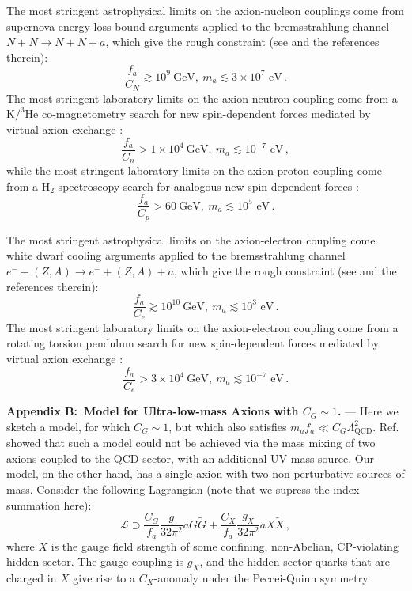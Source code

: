 The most stringent astrophysical limits on the axion-nucleon couplings come from supernova energy-loss bound arguments applied to the bremsstrahlung channel $N + N \to N + N + a$, which give the rough constraint (see \cite{Raffelt2008LNP} and the references therein):
\begin{equation}
\label{aNN_SN_limits}
\frac{f_a}{C_N} \gtrsim 10^9 ~\textrm{GeV}, ~\textrm{$m_a \lesssim 3\times 10^{7}$ eV} \, .
\end{equation}
The most stringent laboratory limits on the axion-neutron coupling come from a K$/^{3}$He co-magnetometry search for new spin-dependent forces mediated by virtual axion exchange \cite{Romalis2009_NF}:
\begin{equation}
\label{ann_lab_limits}
\frac{f_a}{C_n} > 1 \times 10^4 ~\textrm{GeV}, ~\textrm{$m_a \lesssim 10^{-7}$ eV} \, ,
\end{equation}
while the most stringent laboratory limits on the axion-proton coupling come from a H$_{2}$ spectroscopy search for analogous new spin-dependent forces \cite{Romalis2009_NF,Ramsey1979}:
\begin{equation}
\label{app_lab_limits}
\frac{f_a}{C_p} > 60 ~\textrm{GeV}, ~\textrm{$m_a \lesssim 10^{5}$ eV}  \, .
\end{equation}


The most stringent astrophysical limits on the axion-electron coupling come white dwarf cooling arguments applied to the bremsstrahlung channel $e^{-} + (Z,A) \to e^{-} + (Z,A) + a$, which give the rough constraint (see \cite{Raffelt2008LNP} and the references therein):
\begin{equation}
\label{aee_WD_limits}
\frac{f_a}{C_e} \gtrsim 10^{10} ~\textrm{GeV}, ~\textrm{$m_a \lesssim 10^3$ eV} \, .
\end{equation}
The most stringent laboratory limits on the axion-electron coupling come from a rotating torsion pendulum search for new spin-dependent forces mediated by virtual axion exchange \cite{Adelberger2013}:
\begin{equation}
\label{aee_lab_limits}
\frac{f_a}{C_e} > 3 \times 10^4 ~\textrm{GeV}, ~\textrm{$m_a \lesssim 10^{-7}$ eV} \, .
\end{equation}


\textbf{Appendix B:~Model for Ultra-low-mass Axions with $C_G\sim 1$.} ---
Here we sketch a model, for which $C_G\sim 1$, but which also satisfies $m_af_a\ll C_G\Lambda_{\mathrm{QCD}}^2$. Ref.~\cite{Blum2014} showed that such a model could not be achieved via the mass mixing of two axions coupled to the QCD sector, with an additional UV mass source.
Our model, on the other hand, has a single axion with two non-perturbative sources of mass. Consider the following Lagrangian (note that we supress the index summation here):
\begin{equation}
\label{Hidden-QCD_L}
\mathcal{L}\supset \frac{C_G}{f_a}\frac{g}{32 \pi^2}a G\tilde{G}+\frac{C_X}{f_a}\frac{g_X}{32 \pi^2}a X\tilde{X} \, ,
\end{equation}
where $X$ is the gauge field strength of some confining, non-Abelian, CP-violating hidden sector.
The gauge coupling is $g_X$, and the hidden-sector quarks that are charged in $X$ give rise to a $C_X$-anomaly under the Peccei-Quinn symmetry.

